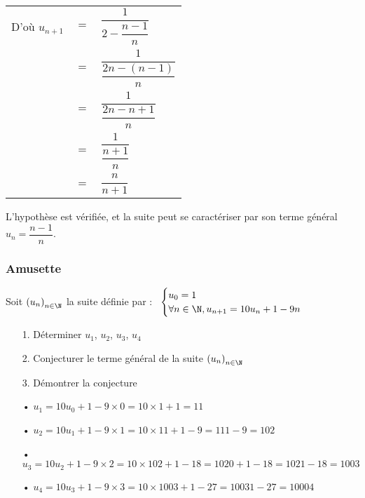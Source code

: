 \begin{tabular}{lll}
D'où $u_{n+1}$ & $ = $ & $ \dfrac{1}{2 - \dfrac{n-1}{n}}$ \vspace*{.3cm}  \\
& $ = $ & $\dfrac{1}{\dfrac{2n - \left(n-1\right)}{n}}$ \vspace*{.3cm} \\
& $=$ & $\dfrac{1}{\dfrac{2n - n + 1}{n}}$ \vspace*{.3cm} \\
& $=$ & $\dfrac{1}{\dfrac{n+1}{n}}$ \vspace*{.3cm} \\
& $=$ & $\dfrac{n}{n+1}$ \vspace*{.3cm} \\
\end{tabular}

\vspace*{.3cm}

L'hypothèse est vérifiée, et la suite peut se caractériser par son terme général $u_n = \dfrac{n-1}{n}$.

\newpage
 
\subsubsection{Amusette}

Soit $\left(u_n\right)_{n \in \N}$ la suite définie par :$ \; \; \; \begin{cases}
u_0 = 1 \\
\forall n \in \N, u_{n+1} = 10u_n + 1 - 9n \\
\end{cases}$ \\

\begin{itemize}
\item[1.] Déterminer $u_1$, $u_2$, $u_3$, $u_4$ \\
\item[2.] Conjecturer le terme général de la suite $\left(u_n\right)_{n \in \N}$ \\
\item[3.] Démontrer la conjecture \\
\end{itemize}

\begin{itemize}
\item[•] $u_1 = 10u_0 + 1 - 9 \times 0 = 10 \times 1 + 1 = 11$ \\
\item[•] $u_2 = 10u_1 + 1 - 9 \times 1 = 10 \times 11 + 1 - 9 = 111 - 9 = 102$ \\
\item[•] $u_3 = 10u_2 + 1 - 9 \times 2 = 10 \times 102 + 1 - 18 = 1020 + 1 - 18 = 1021 - 18 = 1003 $ \\
\item[•] $u_4 = 10u_3 + 1 - 9 \times 3 = 10 \times 1003 + 1 - 27 = 10031 - 27 = 10004$ \\
\end{itemize}

